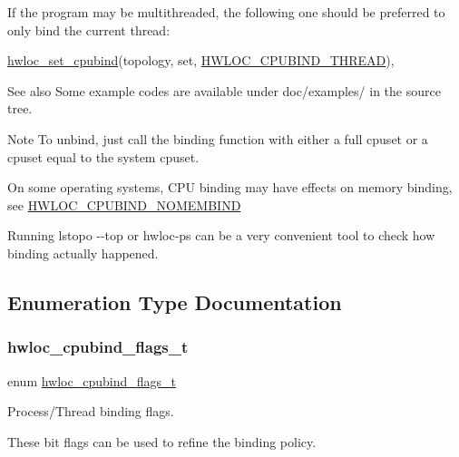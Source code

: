 If the program may be multithreaded, the following one should be preferred to only bind the current thread\+:


\begin{DoxyCode}
\hyperlink{a00190_ga80bc07473a8edf840cae17bd7ec21d48}{hwloc\_set\_cpubind}(topology, \textcolor{keyword}{set}, \hyperlink{a00190_gga217dc8d373f8958cc93c154ebce1c71caf1b6bbad00d7b1017b918e3719f4d421}{HWLOC\_CPUBIND\_THREAD}),
\end{DoxyCode}


\begin{DoxySeeAlso}{See also}
Some example codes are available under doc/examples/ in the source tree.
\end{DoxySeeAlso}
\begin{DoxyNote}{Note}
To unbind, just call the binding function with either a full cpuset or a cpuset equal to the system cpuset.

On some operating systems, C\+PU binding may have effects on memory binding, see \hyperlink{a00190_gga217dc8d373f8958cc93c154ebce1c71ca41ce440443cc3087caed95ab60edcad6}{H\+W\+L\+O\+C\+\_\+\+C\+P\+U\+B\+I\+N\+D\+\_\+\+N\+O\+M\+E\+M\+B\+I\+ND}

Running lstopo -\/-\/top or hwloc-\/ps can be a very convenient tool to check how binding actually happened. 
\end{DoxyNote}


\subsection{Enumeration Type Documentation}
\mbox{\label{a00190_ga217dc8d373f8958cc93c154ebce1c71c}} 
\subsubsection{\texorpdfstring{hwloc\+\_\+cpubind\+\_\+flags\+\_\+t}{hwloc\_cpubind\_flags\_t}}
{\footnotesize\ttfamily enum \hyperlink{a00190_ga217dc8d373f8958cc93c154ebce1c71c}{hwloc\+\_\+cpubind\+\_\+flags\+\_\+t}}



Process/\+Thread binding flags. 

These bit flags can be used to refine the binding policy.


